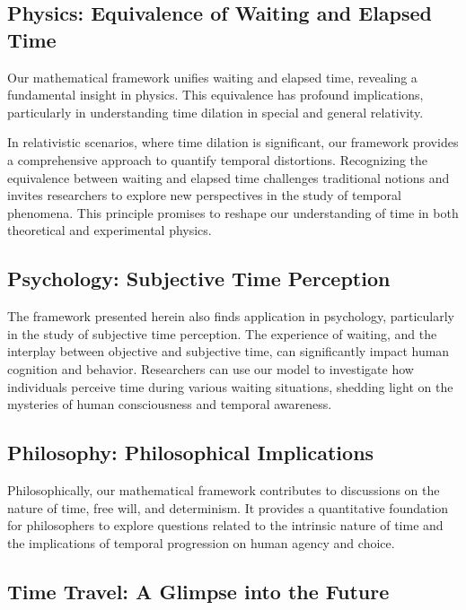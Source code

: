 \documentclass{article}
\begin{document}
\subsection{Physics: Equivalence of Waiting and Elapsed Time}

Our mathematical framework unifies waiting and elapsed time, revealing a fundamental insight in physics. This equivalence has profound implications, particularly in understanding time dilation in special and general relativity.

In relativistic scenarios, where time dilation is significant, our framework provides a comprehensive approach to quantify temporal distortions. Recognizing the equivalence between waiting and elapsed time challenges traditional notions and invites researchers to explore new perspectives in the study of temporal phenomena. This principle promises to reshape our understanding of time in both theoretical and experimental physics.


\subsection{Psychology: Subjective Time Perception}

The framework presented herein also finds application in psychology, particularly in the study of subjective time perception. The experience of waiting, and the interplay between objective and subjective time, can significantly impact human cognition and behavior. Researchers can use our model to investigate how individuals perceive time during various waiting situations, shedding light on the mysteries of human consciousness and temporal awareness.

\subsection{Philosophy: Philosophical Implications}

Philosophically, our mathematical framework contributes to discussions on the nature of time, free will, and determinism. It provides a quantitative foundation for philosophers to explore questions related to the intrinsic nature of time and the implications of temporal progression on human agency and choice.

\subsection{Time Travel: A Glimpse into the Future}
\end{document}
